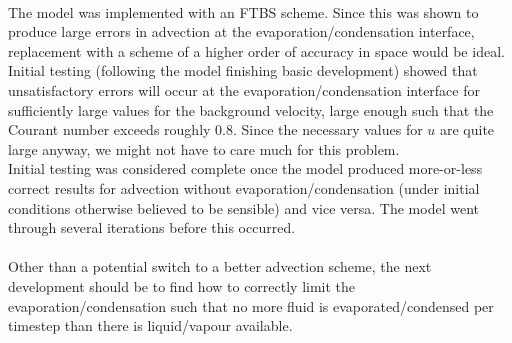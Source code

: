 \documentclass[11pt]{article}
\begin{document}
~\\
The model was implemented with an FTBS scheme. Since this was shown to produce large errors in advection at the evaporation/condensation interface, replacement with a scheme of a higher order of accuracy in space would be ideal.
Initial testing (following the model finishing basic development) showed that unsatisfactory errors will occur at the evaporation/condensation interface for sufficiently large values for the background velocity, large enough such that the Courant number exceeds roughly 0.8. Since the necessary values for $u$ are quite large anyway, we might not have to care much for this problem.\\
Initial testing was considered complete once the model produced more-or-less correct results for advection without evaporation/condensation (under initial conditions otherwise believed to be sensible) and vice versa. The model went through several iterations before this occurred.\\
~\\
Other than a potential switch to a better advection scheme, the next development should be to find how to correctly limit the evaporation/condensation such that no more fluid is evaporated/condensed per timestep than there is liquid/vapour available.
\end{document}
